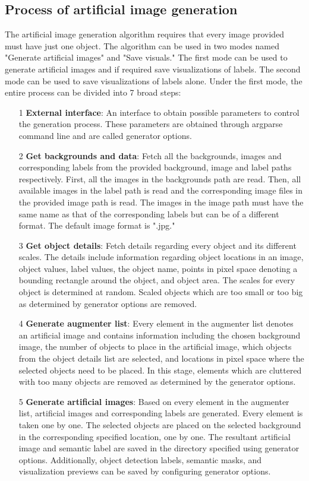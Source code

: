 \subsection{Process of artificial image generation}
The artificial image generation algorithm requires that every image provided must have just one object. The algorithm can be used in two modes named "Generate artificial images" and "Save visuals." The first mode can be used to generate artificial images and if required save visualizations of labels. The second mode can be used to save visualizations of labels alone. Under the first mode, the entire process can be divided into 7 broad steps:
	\begin{itemize}
		\item[1] \textbf{External interface}: An interface to obtain possible parameters to control the generation process. These parameters are obtained through argparse command line and are called generator options.
		\item[2] \textbf{Get backgrounds and data}: Fetch all the backgrounds, images and corresponding labels from the provided background, image and label paths respectively. First, all the images in the backgrounds path are read. Then, all available images in the label path is read and the corresponding image files in the provided image path is read. The images in the image path must have the same name as that of the corresponding labels but can be of a different format. The default image format is ".jpg."
		\item[3] \textbf{Get object details}: Fetch details regarding every object and its different scales. The details include information regarding object locations in an image, object values, label values, the object name, points in pixel space denoting a bounding rectangle around the object, and object area. The scales for every object is determined at random. Scaled objects which are too small or too big as determined by generator options are removed.
		\item[4] \textbf{Generate augmenter list}: Every element in the augmenter list denotes an artificial image and contains information including the chosen background image, the number of objects to place in the artificial image, which objects from the object details list are selected, and locations in pixel space where the selected objects need to be placed. In this stage, elements which are cluttered with too many objects are removed as determined by the generator options.
		\item[5] \textbf{Generate artificial images}: Based on every element in the augmenter list, artificial images and corresponding labels are generated. Every element is taken one by one. The selected objects are placed on the selected background in the corresponding specified location, one by one. The resultant artificial image and semantic label are saved in the directory specified using generator options. Additionally, object detection labels, semantic masks, and visualization previews can be saved by configuring generator options.

\end{itemize}
